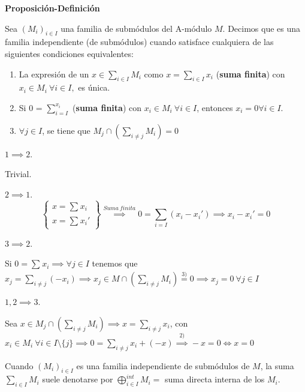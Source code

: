 \documentclass[openany]{book}
\begin{document}
\begin{proposition}
    \textbf{Proposición-Definición}

    Sea $ (M_i)_{i \in I}$ una familia de submódulos del A-módulo $ M$. Decimos que es una familia independiente (de submódulos) cuando satisface cualquiera de las siguientes condiciones equivalentes:
    \begin{enumerate}
        \item La expresión de un $ x \in \sum\limits_{i \in I}^{}M_i$ como $ x=\sum\limits_{i \in I}^{}x_i$ (\textbf{suma finita}) con $ x_i \in M_i\ \forall  i \in I,$ es única.
        \item Si 0 = $ \sum\limits_{i=I}^{x_i}$ (\textbf{suma finita}) con $ x_i \in M_i\ \forall  i \in I$, entonces $ x_i =0 \forall i \in I$.
        \item $ \forall j \in I$, se tiene que $ M_j \cap \left( \sum\limits_{i\ne j}^{} M_i \right) = 0$
    \end{enumerate}
\end{proposition}


\begin{demonstration}
    
    \noindent $ 1\implies 2$.

    Trivial.

    \noindent $ 2 \implies 1$.
    $$ \left\{
    \begin{array}{l}
        x = \sum\limits_{}^{}x_i \\ 
        x = \sum\limits_{}^{}x_i'
    \end{array}
    \right\} \stackrel{Suma\ finita}{\implies} 0 = \sum\limits_{i=I}^{} (x_i- x_i') \implies x_i-x_i' = 0 $$

    \noindent $ 3 \implies 2$.

    Si $  0 = \sum\limits_{}^{}x_i \implies \forall j \in I$ tenemos que $ x_j = \sum\limits_{i\ne j}^{}(-x_i) \implies x_j \in M \cap \left( \sum\limits_{i \ne j}^{}M_i \right) \stackrel{3)}{=} 0 \implies x_j = 0\ \forall j \in I$

    \noindent $ 1,2 \implies 3$.

    Sea $ x \in M_j \cap \left( \sum\limits_{i\ne j}^{}M_i   \right) \implies x = \sum\limits_{i\ne j}^{}x_i$, con $ x_i \in M_i\ \forall  i \in I \setminus \{j\} \implies 0 = \sum\limits_{i \ne j}^{}x_i + (-x) \stackrel{2)}{\implies} -x = 0 \iff x = 0$
\end{demonstration}


Cuando $ (M_i)_{i \in I}$ es una familia independiente de submódulos de $ M$, la suma $ \sum\limits_{i \in I}^{}M_i$ suele denotarse por $ \bigoplus\limits_{i \in I}^{int}M_i = $ suma directa interna de los $ M_i$.
\end{document}
